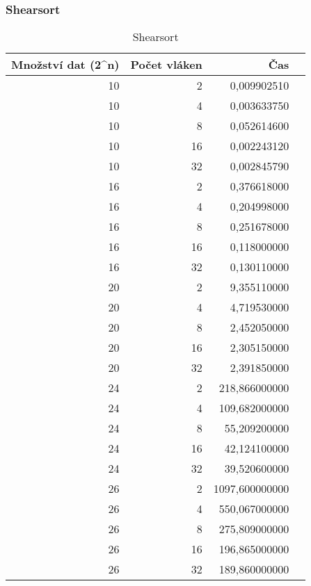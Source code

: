 \documentclass[12pt]{article}
\begin{document}
\subsubsection{Shearsort}
\begin{table}[H]
\begin{center}
\begin{tabular}{|r|r|r|r|}
\hline Množství dat (2^n) & Počet vláken & Čas \\ \hline
10 &  2  & 0,009902510 \\ \hline
10 &  4  & 0,003633750 \\ \hline
10 &  8  & 0,052614600 \\ \hline
10 &  16 & 0,002243120 \\ \hline
10 &  32 & 0,002845790 \\ \hline
16 &  2  & 0,376618000 \\ \hline
16 &  4  & 0,204998000 \\ \hline
16 &  8  & 0,251678000 \\ \hline
16 &  16 & 0,118000000 \\ \hline
16 &  32 & 0,130110000 \\ \hline
20 &  2  & 9,355110000 \\ \hline
20 &  4  & 4,719530000 \\ \hline
20 &  8  & 2,452050000 \\ \hline
20 &  16 & 2,305150000 \\ \hline
20 &  32 & 2,391850000 \\ \hline
24 &  2  & 218,866000000 \\ \hline
24 &  4  & 109,682000000 \\ \hline
24 &  8  & 55,209200000 \\ \hline
24 &  16 & 42,124100000 \\ \hline
24 &  32 & 39,520600000 \\ \hline
26 &  2  & 1097,600000000 \\ \hline
26 &  4  & 550,067000000 \\ \hline
26 &  8  & 275,809000000 \\ \hline
26 &  16 & 196,865000000 \\ \hline
26 &  32 & 189,860000000 \\ \hline
\end{tabular} 
\end{center}
\caption{Shearsort}
\end{table}
\end{document}
